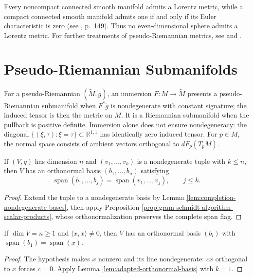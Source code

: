 Every noncompact connected smooth manifold admits a Lorentz metric, while a compact connected smooth
manifold admits one if and only if its Euler characteristic is zero (see \cite{ON83}, p.~149). Thus no
even-dimensional sphere admits a Lorentz metric. For further treatments of pseudo-Riemannian metrics,
see \cite{ON83} and \cite{HE73}.
\section{Pseudo-Riemannian Submanifolds}

For a pseudo-Riemannian $(\widetilde M,\widetilde g)$, an immersion $F:M\to\widetilde M$ presents a pseudo-Riemannian submanifold when $F^*\widetilde g$ is nondegenerate with constant signature; the induced tensor is then the metric on $M$. It is a Riemannian submanifold when the pullback is positive definite. Immersion alone does not ensure nondegeneracy: the diagonal $\{(\xi,\tau):\xi=\tau\}\subset\mathbb R^{1,1}$ has identically zero induced tensor. For $p\in M$, the normal space consists of ambient vectors orthogonal to $dF_p(T_pM)$.

\begin{lemma}
\label{lem:adapted-orthonormal-basis}
\leanok
{}
If $(V,q)$ has dimension $n$ and $(v_1,\ldots,v_k)$ is a nondegenerate tuple with $k\le n$, then $V$ has an orthonormal basis $(b_1,\ldots,b_n)$ satisfying
\[
\operatorname{span}(b_1,\ldots,b_j)=\operatorname{span}(v_1,\ldots,v_j),\qquad j\le k.
\]
\end{lemma}
\begin{proof}
\leanok
{}
\sketch Extend the tuple to a nondegenerate basis by Lemma \ref{lem:completion-nondegenerate-bases}, then apply Proposition \ref{prop:gram-schmidt-algorithm-scalar-products}, whose orthonormalization preserves the complete span flag.
\end{proof}

\begin{lemma}
\label{lem:adapted-orthonormal-basis-line}
\leanok
{}
If $\dim V=n\ge1$ and $\langle x,x\rangle\ne0$, then $V$ has an orthonormal basis $(b_i)$ with $\operatorname{span}(b_1)=\operatorname{span}(x)$.
\end{lemma}
\begin{proof}
\leanok
{}
\sketch The hypothesis makes $x$ nonzero and its line nondegenerate: $cx$ orthogonal to $x$ forces $c=0$. Apply Lemma \ref{lem:adapted-orthonormal-basis} with $k=1$.
\end{proof}

